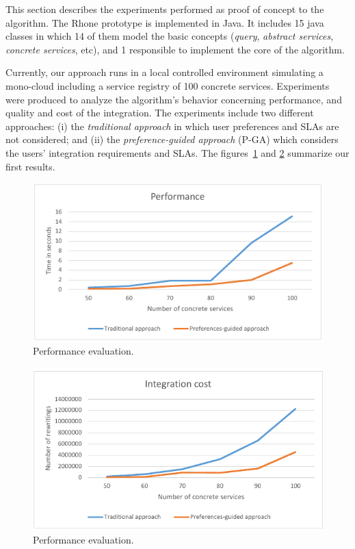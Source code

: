This section describes the experiments performed as proof of concept to the algorithm.
The Rhone prototype is implemented in Java.
It includes 15 java classes in which 14 of them model the basic concepts 
(\textit{query}, \textit{abstract services}, \textit{concrete services}, etc), 
and 1 responsible to implement the core of the algorithm. 


Currently, our approach runs in a local controlled environment simulating a mono-cloud including a service registry of 100 concrete services. 
Experiments were produced to analyze the algorithm's behavior concerning performance, and quality and cost of the integration. 
The experiments include two different approaches: (i) the \textit{traditional approach} in which user preferences and SLAs are not considered; and (ii) the \textit{preference-guided approach} (P-GA) which considers the users' integration requirements and SLAs.
The figures~\ref{fig01} and \ref{fig02} summarize our first results.

\begin{figure}[!h]
\centering
\includegraphics[scale=0.8]{fig1.pdf}
\caption{Performance evaluation.}\label{fig01}
\end{figure} 

\begin{figure}[!h]
\centering
\includegraphics[scale=0.72]{fig2.pdf}
\caption{Performance evaluation.}\label{fig02}
\end{figure} 

